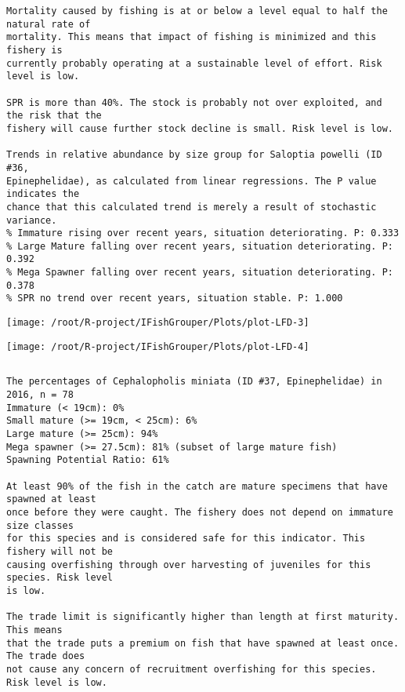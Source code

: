 \documentclass{report}\usepackage[]{graphicx}\usepackage[]{color}
\makeatletter
\def\maxwidth{ %
  \ifdim\Gin@nat@width>\linewidth
    \linewidth
  \else
    \Gin@nat@width
  \fi
}
\newenvironment{kframe}{%
 \def\at@end@of@kframe{}%
 \ifinner\ifhmode%
  \def\at@end@of@kframe{\end{minipage}}%
  \begin{minipage}{\columnwidth}%
 \fi\fi%
 \def\FrameCommand##1{\hskip\@totalleftmargin \hskip-\fboxsep
 \colorbox{shadecolor}{##1}\hskip-\fboxsep
     \hskip-\linewidth \hskip-\@totalleftmargin \hskip\columnwidth}%
 \MakeFramed {\advance\hsize-\width
   \@totalleftmargin\z@ \linewidth\hsize
   \@setminipage}}%
 {\par\unskip\endMakeFramed%
 \at@end@of@kframe}
\newenvironment{knitrout}{}{} %
\makeatother
\begin{document}
\begin{knitrout}
\begin{kframe}
\begin{verbatim}
Mortality caused by fishing is at or below a level equal to half the natural rate of
mortality. This means that impact of fishing is minimized and this fishery is
currently probably operating at a sustainable level of effort. Risk level is low.
 
SPR is more than 40%. The stock is probably not over exploited, and the risk that the
fishery will cause further stock decline is small. Risk level is low.
 
Trends in relative abundance by size group for Saloptia powelli (ID #36,
Epinephelidae), as calculated from linear regressions. The P value indicates the
chance that this calculated trend is merely a result of stochastic variance.
% Immature rising over recent years, situation deteriorating. P: 0.333
% Large Mature falling over recent years, situation deteriorating. P: 0.392
% Mega Spawner falling over recent years, situation deteriorating. P: 0.378
% SPR no trend over recent years, situation stable. P: 1.000
\end{verbatim}
\end{kframe}
\texttt{[image: /root/R-project/IFishGrouper/Plots/plot-LFD-3]} 

\texttt{[image: /root/R-project/IFishGrouper/Plots/plot-LFD-4]} 
\begin{kframe}\begin{verbatim}
\end{verbatim}
\end{kframe}
\clearpage
\newpage
\begin{kframe}\begin{verbatim}The percentages of Cephalopholis miniata (ID #37, Epinephelidae) in 2016, n = 78
Immature (< 19cm): 0%
Small mature (>= 19cm, < 25cm): 6%
Large mature (>= 25cm): 94%
Mega spawner (>= 27.5cm): 81% (subset of large mature fish)
Spawning Potential Ratio: 61%
 
At least 90% of the fish in the catch are mature specimens that have spawned at least
once before they were caught. The fishery does not depend on immature size classes
for this species and is considered safe for this indicator. This fishery will not be
causing overfishing through over harvesting of juveniles for this species. Risk level
is low.

The trade limit is significantly higher than length at first maturity.  This means
that the trade puts a premium on fish that have spawned at least once. The trade does
not cause any concern of recruitment overfishing for this species. Risk level is low.


\end{verbatim}
\end{kframe}
\end{knitrout}
\end{document}
